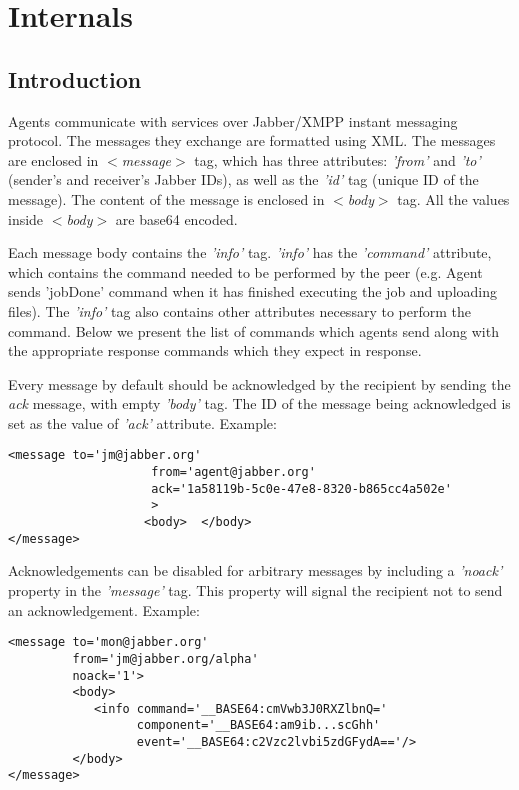 \chapter{\cernvmcopilot Internals}
\label{sct:protocol}

\section{Introduction}
Agents communicate with services over Jabber/XMPP \cite{rfc3920,rfc3921} instant messaging protocol. The messages they
exchange are formatted using XML. The messages are enclosed in \emph{$<$message$>$} tag, which has three attributes: \emph{'from'} and
\emph{'to'} (sender's and receiver's Jabber IDs), as well as the \emph{'id'} tag (unique ID of the message). The content of the message is enclosed in \emph{$<$body$>$} tag. All the values inside \emph{$<$body$>$} are
base64 \cite{rfc3548} encoded.

Each message body contains the \emph{'info'} tag. \emph{'info'} has the \emph{'command'} attribute, which contains the command needed
to be performed by the peer (e.g. Agent sends 'jobDone' command when it has finished executing the job and uploading files). The \emph{'info'} tag also contains other attributes necessary to perform the command. Below we present the list of commands which agents send along with the appropriate response commands which they expect in response.

Every message by default should be acknowledged by the recipient by sending the \emph{ack} message, with empty \emph{'body'} tag. The ID of the message being acknowledged is set as the value of \emph{'ack'} attribute.
Example:

\lstset{tabsize=2, basicstyle=\footnotesize, captionpos=b}
\lstset{frame=single, language=XML}
\begin{lstlisting}
<message to='jm@jabber.org'
                    from='agent@jabber.org'
                    ack='1a58119b-5c0e-47e8-8320-b865cc4a502e'
                    >
                   <body>  </body>
</message>
\end{lstlisting}

Acknowledgements can be disabled for arbitrary messages by including a \emph{'noack'} property in the \emph{'message'} tag.
This property will signal the recipient not to send an acknowledgement.
Example:

\lstset{tabsize=2, basicstyle=\footnotesize, captionpos=b}
\lstset{caption=Example message , label=fig:noack}
\lstset{frame=single, language=XML}
\begin{lstlisting}
<message to='mon@jabber.org'
         from='jm@jabber.org/alpha'
         noack='1'>
         <body>
            <info command='__BASE64:cmVwb3J0RXZlbnQ='
                  component='__BASE64:am9ib...scGhh'
                  event='__BASE64:c2Vzc2lvbi5zdGFydA=='/>
         </body>
</message>
\end{lstlisting}

